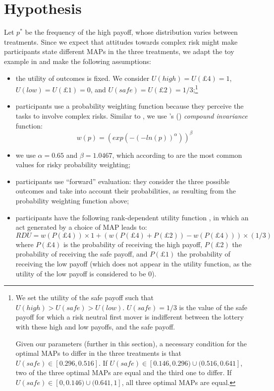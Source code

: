 \section{Hypothesis}\label{sec:hyp}
Let $p^*$ be the frequency of the high payoff, whose distribution varies between treatments.
Since we expect that attitudes towards complex risk might make participants state different MAPs in the three treatments, we adapt the toy example in \cite{Li2020a} and make the following assumptions:
\begin{itemize}
\item the utility of outcomes is fixed. We consider $U(high) = U(\pounds4) = 1$, $U(low) = U(\pounds1) = 0$, and $U(safe) = U(\pounds2) = 1/3$;\footnote{
We set the utility of the safe payoff such that $U(high) > U(safe) > U(low)$.
$U(safe) = 1/3$ is the value of the safe payoff for which a risk neutral first mover is indifferent between the lottery with these high and low payoffs, and the safe payoff.

Given our parameters (further in this section), a necessary condition for the optimal MAPs to differ in the three treatments is that $U(safe) \in [0.296, 0.516]$.
If $U(safe) \in [0.146, 0.296) \cup (0.516, 0.641]$, two of the three optimal MAPs are equal and the third one to differ.
If $U(safe) \in [0, 0.146) \cup (0.641, 1]$, all three optimal MAPs are equal.
}
\item participants use a probability weighting function because they perceive the tasks to involve complex risks. Similar to \cite{Li2020a}, we use \citeauthor{Prelec1998}'s (\citeyear{Prelec1998}) \textit{compound invariance} function:
$$w(p) = (exp(-(-ln(p))^\alpha))^\beta$$ 
\item we use $\alpha = 0.65$ and $\beta = 1.0467$, which according to \cite{Li2020a} are the most common values for risky probability weighting;
\item participants use ``forward'' evaluation: they consider the three possible outcomes and take into account their probabilities, as resulting from the probability weighting function above;
\item participants have the following rank-dependent utility function \citep{Schmeidler1989}, in which an act generated by a choice of MAP leads to:
$$RDU = w(P(\pounds4)) \times 1 + (w(P(\pounds4) + P(\pounds2)) - w(P(\pounds4))) \times (1/3)$$
where $P(\pounds4)$ is the probability of receiving the high payoff, $P(\pounds2)$ the probability of receiving the safe payoff, and $P(\pounds1)$ the probability of receiving the low payoff (which does not appear in the utility function, as the utility of the low payoff is considered to be 0).
\end{itemize}

